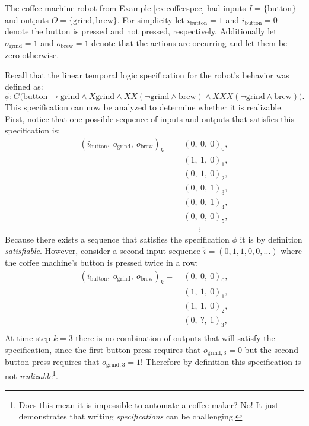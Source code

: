 \begin{example}
The coffee machine robot from Example \ref{ex:coffeespec} had inputs $I = \{\text{button}\}$ and outputs $O = \{\text{grind}, \text{brew}\}$. For simplicity let $i_\text{button} = 1$ and $i_\text{button} = 0$ denote the button is pressed and not pressed, respectively. Additionally let $o_\text{grind}=1$ and $o_\text{brew}=1$ denote that the actions are occurring and let them be zero otherwise. 

Recall that the linear temporal logic specification for the robot's behavior was defined as:
\begin{equation*}
\phi : G \big( \text{button} \to \text{grind} \land X \text{grind} \land XX (\lnot\text{grind} \land \text{brew}) \land XXX (\lnot\text{grind} \land\text{brew}) \big).
\end{equation*}
This specification can now be analyzed to determine whether it is realizable. First, notice that one possible sequence of inputs and outputs that satisfies this specification is:
\begin{equation*}
\begin{split}
(i_\text{button}, \: o_\text{grind}, \: o_\text{brew})_k = \:&(0, \: 0, \: 0)_0, \\
&(1, \: 1, \: 0)_1, \\
&(0, \: 1, \: 0)_2, \\
&(0, \: 0, \: 1)_3, \\
&(0, \: 0, \: 1)_4, \\
&(0, \: 0, \: 0)_5, \\
& \quad\:\:\:\: \vdots
\end{split}
\end{equation*}
Because there exists a sequence that satisfies the specification $\phi$ it is by definition \textit{satisfiable}. However, consider a second input sequence $\hat{i} = (0, 1, 1, 0, 0, \dots)$ where the coffee machine's button is pressed twice in a row:
\begin{equation*}
\begin{split}
(i_\text{button}, \: o_\text{grind}, \: o_\text{brew})_k = \:&(0, \: 0, \: 0)_0, \\
&(1, \: 1, \: 0)_1, \\
&(1, \: 1, \: 0)_2, \\
&(0, \: ?, \: 1)_3, \\
\end{split}
\end{equation*}
At time step $k=3$ there is no combination of outputs that will satisfy the specification, since the first button press requires that $o_{\text{grind}, 3} = 0$ but the second button press requires that $o_{\text{grind}, 3} = 1$! Therefore by definition this specification is not \textit{realizable}\footnote{Does this mean it is impossible to automate a coffee maker? No! It just demonstrates that writing \textit{specifications} can be challenging.}.
\end{example}



